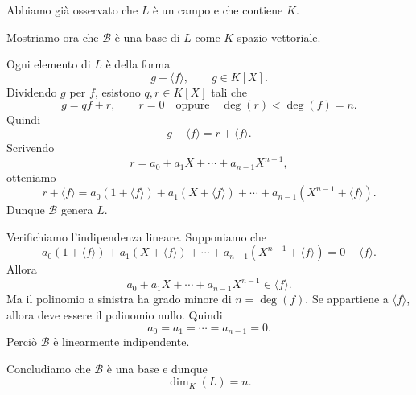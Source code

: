\documentclass[a4paper]{article}
\begin{document}
\begin{radioactive}
\begin{snippetproof}{}
    Abbiamo già osservato che \(L\) è un campo e che contiene \(K\).

    Mostriamo ora che \(\mathcal{B}\) è una base di \(L\) come \(K\)-spazio vettoriale.

    Ogni elemento di \(L\) è della forma
    \[
        g+\langle f \rangle,
        \qquad
        g\in K[X].
    \]
    Dividendo \(g\) per \(f\), esistono \(q,r\in K[X]\) tali che
    \[
        g=qf+r,
        \qquad
        r=0
        \quad
        \text{oppure}
        \quad
        \deg(r)<\deg(f)=n.
    \]
    Quindi
    \[
        g+\langle f \rangle=r+\langle f \rangle.
    \]
    Scrivendo
    \[
        r=a_0+a_1X+\cdots+a_{n-1}X^{n-1},
    \]
    otteniamo
    \[
        r+\langle f \rangle
        =
        a_0(1+\langle f \rangle)
        +
        a_1(X+\langle f \rangle)
        +
        \cdots
        +
        a_{n-1}(X^{n-1}+\langle f \rangle).
    \]
    Dunque \(\mathcal{B}\) genera \(L\).

    Verifichiamo l'indipendenza lineare. Supponiamo che
    \[
        a_0(1+\langle f \rangle)
        +
        a_1(X+\langle f \rangle)
        +
        \cdots
        +
        a_{n-1}(X^{n-1}+\langle f \rangle)
        =
        0+\langle f \rangle.
    \]
    Allora
    \[
        a_0+a_1X+\cdots+a_{n-1}X^{n-1}\in\langle f \rangle.
    \]
    Ma il polinomio a sinistra ha grado minore di \(n=\deg(f)\). Se appartiene a \(\langle f \rangle\), allora deve essere il polinomio nullo. Quindi
    \[
        a_0=a_1=\cdots=a_{n-1}=0.
    \]
    Perciò \(\mathcal{B}\) è linearmente indipendente.

    Concludiamo che \(\mathcal{B}\) è una base e dunque
    \[
        \dim_K(L)=n.
    \]
\end{snippetproof}
\end{radioactive}
\end{document}
